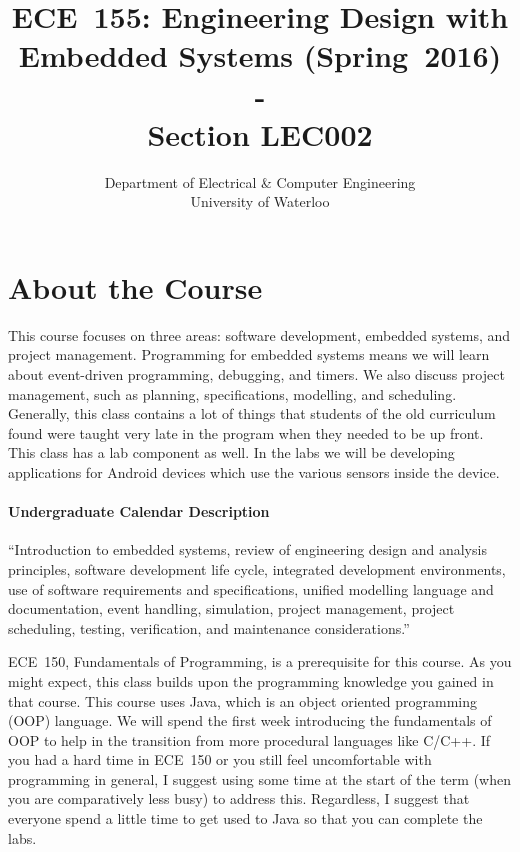 \documentclass[letterpaper,10pt]{article}
\date{}
\title{\bf\LARGE ECE~155: Engineering Design with Embedded Systems (Spring~2016) \\ - \\ Section LEC002}
\author{Department of Electrical \& Computer Engineering \\
                University of Waterloo}
\begin{document}
\maketitle
\vspace{-0.5in}

\section*{About the Course}

This course focuses on three areas: software development, embedded systems, and project management. Programming for embedded systems means we will learn about event-driven programming, debugging, and timers. We also discuss project management, such as planning, specifications, modelling, and scheduling. Generally, this class contains a lot of things that students of the old curriculum found were taught very late in the program when they needed to be up front. This class has a lab component as well. In the labs we will be developing applications for Android devices which use the various sensors inside the device.

\paragraph{Undergraduate Calendar Description} ``Introduction to embedded systems, review of engineering design and analysis principles, software development life cycle, integrated development environments, use of software requirements and specifications, unified modelling language and documentation, event handling, simulation, project management, project scheduling, testing, verification, and maintenance considerations.''

ECE~150, Fundamentals of Programming, is a prerequisite for this course. As you might expect, this class builds upon the programming knowledge you gained in that course. This course uses Java, which is an object oriented programming (OOP) language. We will spend the first week introducing the fundamentals of OOP to help in the transition from more procedural languages like C/C++. If you had a hard time in ECE~150 or you still feel uncomfortable with programming in general, I suggest using some time at the start of the term (when you are comparatively less busy) to address this. Regardless, I suggest that everyone spend a little time to get used to Java so that you can complete the labs.
\end{document}
